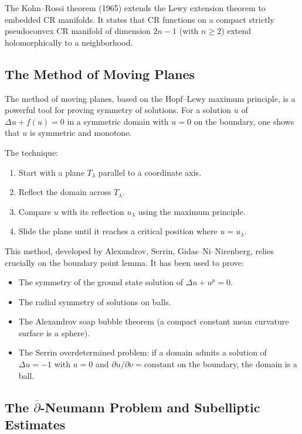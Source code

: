 The Kohn--Rossi theorem (1965) extends the Lewy extension theorem to embedded CR manifolds. It states that CR functions on a compact strictly pseudoconvex CR manifold of dimension $2n-1$ (with $n \geq 2$) extend holomorphically to a neighborhood.

\subsection{The Method of Moving Planes}

The method of moving planes, based on the Hopf--Lewy maximum principle, is a powerful tool for proving symmetry of solutions. For a solution $u$ of $\Delta u + f(u) = 0$ in a symmetric domain with $u = 0$ on the boundary, one shows that $u$ is symmetric and monotone.

The technique:
\begin{enumerate}
    \item Start with a plane $T_\lambda$ parallel to a coordinate axis.
    \item Reflect the domain across $T_\lambda$.
    \item Compare $u$ with its reflection $u_\lambda$ using the maximum principle.
    \item Slide the plane until it reaches a critical position where $u = u_\lambda$.
\end{enumerate}

This method, developed by Alexandrov, Serrin, Gidas--Ni--Nirenberg, relies crucially on the boundary point lemma. It has been used to prove:
\begin{itemize}
    \item The symmetry of the ground state solution of $\Delta u + u^p = 0$.
    \item The radial symmetry of solutions on balls.
    \item The Alexandrov soap bubble theorem (a compact constant mean curvature surface is a sphere).
    \item The Serrin overdetermined problem: if a domain admits a solution of $\Delta u = -1$ with $u = 0$ and $\partial u/\partial \nu = \text{constant}$ on the boundary, the domain is a ball.
\end{itemize}

\subsection{The \texorpdfstring{$\overline{\partial}$}{d-bar}-Neumann Problem and Subelliptic Estimates}

